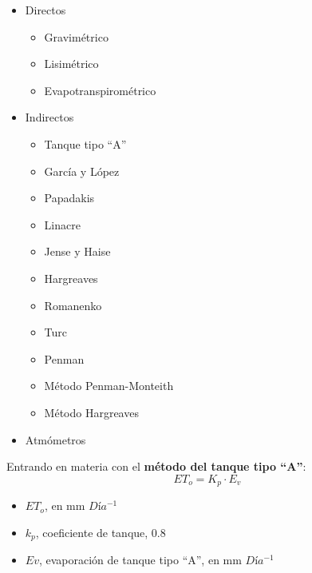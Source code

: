         \begin{itemize}
            \item Directos \begin{itemize}
                \item Gravimétrico
                \item Lisimétrico
                \item Evapotranspirométrico
            \end{itemize} 
            \item Indirectos \begin{itemize}
                \item Tanque tipo ``A''
                \item García y López
                \item Papadakis
                \item Linacre
                \item Jense y Haise
                \item Hargreaves
                \item Romanenko
                \item Turc
                \item Penman
                \item Método Penman-Monteith 
                \item Método Hargreaves
            \end{itemize}
            \item Atmómetros
        \end{itemize}
        
        Entrando en materia con el \textbf{método del tanque tipo ``A''}:
        \begin{equation}
            ET_o =K_p\cdot E_v
        \end{equation}
        \begin{notation}
            \begin{itemize}
                \item $ET_o$, en mm $Día^{-1}$
                \item $k_p$, coeficiente de tanque, 0.8
                \item $Ev$, evaporación de tanque tipo ``A'', en mm $Día^{-1}$
            \end{itemize}
        \end{notation}
        
